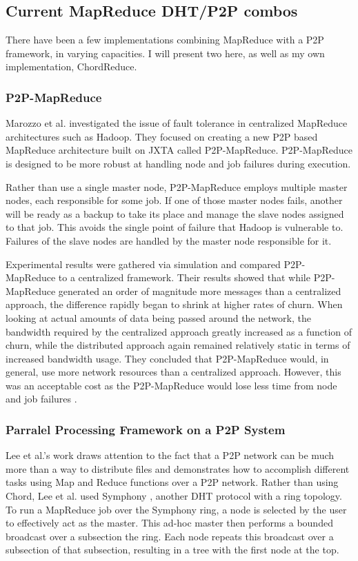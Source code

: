 \documentclass[10pt,letterpaper,twoside]{report}
\begin{document}
\subsection{Current MapReduce DHT/P2P combos}
There have been a few implementations combining MapReduce with a P2P framework, in varying capacities.  
I will present two here, as well as my own implementation, ChordReduce.

\subsubsection{P2P-MapReduce}
Marozzo et al. \cite{marozzo2012p2p} investigated the issue of fault tolerance in centralized MapReduce architectures such as Hadoop.  
They focused on creating a new P2P based MapReduce architecture built on JXTA called P2P-MapReduce.  
P2P-MapReduce is designed to be more robust at handling node and job failures during execution.

Rather than use a single master node, P2P-MapReduce employs multiple master nodes, each responsible for some job.  
If one of those master nodes fails, another will be ready as a backup to take its place and manage the slave nodes assigned to that job.  
This avoids the single point of failure that Hadoop is vulnerable to. Failures of the slave nodes are handled by the master node responsible for it.

Experimental results were gathered via simulation and compared P2P-MapReduce to a centralized framework. 
Their results showed that while P2P-MapReduce generated an order of magnitude more messages than a centralized approach, the difference rapidly began to shrink at higher rates of churn.  
When looking at actual amounts of data being passed around the network, the bandwidth required by the centralized approach greatly increased as a function of churn, while the distributed approach again remained relatively static in terms of increased bandwidth usage. 
They concluded that P2P-MapReduce would, in general, use more network resources than a centralized approach. 
However, this was an acceptable cost as the P2P-MapReduce would lose less time from node and job failures \cite{marozzo2012p2p}.

\subsubsection{Parralel Processing Framework on a P2P System}
Lee et al.'s work \cite{leemap} draws attention to the fact that a P2P network can be much more than a way to distribute files and demonstrates how to accomplish different tasks using Map and Reduce functions over a P2P network.  
Rather than using Chord, Lee et al. used Symphony \cite{symphony}, another DHT protocol with a ring topology.  
To run a MapReduce job over the Symphony ring, a node is selected by the user to effectively act as the master.  
This ad-hoc master then performs a bounded broadcast over a subsection the ring.  
Each node repeats this broadcast over a subsection of that subsection, resulting in a tree with the first node at the top.  
\end{document}
